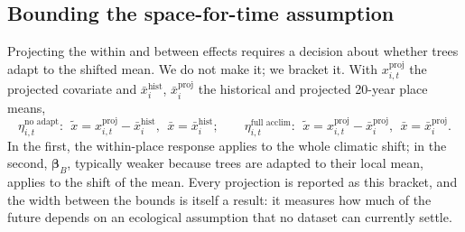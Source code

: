 \subsection{Bounding the space-for-time assumption}
Projecting the within and between effects requires a decision about whether trees adapt to the shifted mean. We do not make it; we bracket it. With $x^{\text{proj}}_{i,t}$ the projected covariate and $\bar x^{\text{hist}}_i$, $\bar x^{\text{proj}}_i$ the historical and projected 20-year place means,
\begin{equation}\label{eq:bracket}
\eta^{\text{no adapt}}_{i,t}:\ \ \tilde x=x^{\text{proj}}_{i,t}-\bar x^{\text{hist}}_i,\ \ \bar x=\bar x^{\text{hist}}_i;\qquad
\eta^{\text{full acclim}}_{i,t}:\ \ \tilde x=x^{\text{proj}}_{i,t}-\bar x^{\text{proj}}_i,\ \ \bar x=\bar x^{\text{proj}}_i.
\end{equation}
In the first, the within-place response applies to the whole climatic shift; in the second, $\bm\beta_B$, typically weaker because trees are adapted to their local mean, applies to the shift of the mean. Every projection is reported as this bracket, and the width between the bounds is itself a result: it measures how much of the future depends on an ecological assumption that no dataset can currently settle.
